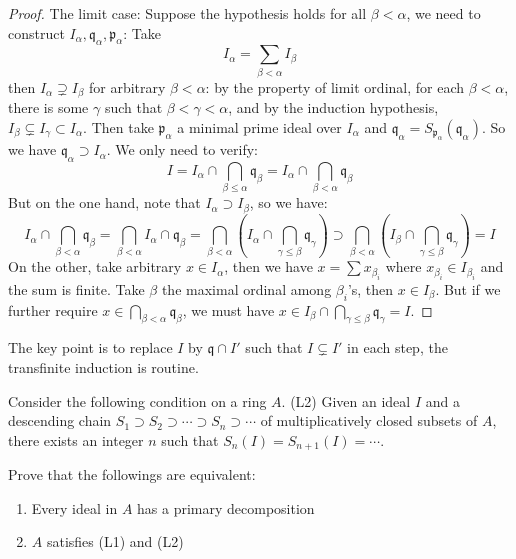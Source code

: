\documentclass{solution}
\begin{document}
\begin{proof}
    The limit case: Suppose the hypothesis holds for all $\beta \lt \alpha$, we need to construct $I_{\alpha}, \mathfrak{q}_{\alpha}, \mathfrak{p}_{\alpha}$: Take
    $$I_{\alpha} = \sum\limits_{\beta \lt \alpha} I_{\beta}$$
    then $I_{\alpha} \supsetneq I_{\beta}$ for arbitrary $\beta \lt \alpha$: by the property of limit ordinal, for each $\beta \lt \alpha$, there is some $\gamma$ such that $\beta \lt \gamma \lt \alpha$, and by the induction hypothesis, $I_{\beta} \subsetneq I_{\gamma} \subset I_{\alpha}$. Then take $\mathfrak{p}_{\alpha}$ a minimal prime ideal over $I_{\alpha}$ and $\mathfrak{q}_{\alpha} = S_{\mathfrak{p}_{\alpha}}(\mathfrak{q}_\alpha)$. So we have $\mathfrak{q}_{\alpha} \supset I_{\alpha}$. We only need to verify:
    $$I = I_{\alpha} \cap \bigcap\limits_{\beta \le \alpha} \mathfrak{q}_{\beta} = I_{\alpha} \cap \bigcap\limits_{\beta \lt \alpha} \mathfrak{q}_{\beta}$$
    But on the one hand, note that $I_{\alpha} \supset I_\beta$, so we have:
    $$I_{\alpha} \cap \bigcap\limits_{ \beta \lt \alpha} \mathfrak{q}_\beta = \bigcap\limits_{ \beta \lt \alpha} I_{\alpha} \cap \mathfrak{q}_\beta = \bigcap\limits_{\beta \lt \alpha} \left(I_{\alpha} \cap \bigcap\limits_{\gamma \le \beta} \mathfrak{q}_{\gamma}\right) \supset \bigcap\limits_{\beta \lt \alpha} \left(I_{\beta} \cap \bigcap\limits_{\gamma \le \beta} \mathfrak{q}_{\gamma}\right) = I$$
    On the other, take arbitrary $x \in I_{\alpha}$, then we have $x = \sum x_{\beta_i}$ where $x_{\beta_i} \in I_{\beta_i}$ and the sum is finite. Take $\beta$ the maximal ordinal among $\beta_i$'s, then $x \in I_{\beta}$. But if we further require $x \in \bigcap\limits_{\beta \lt \alpha} \mathfrak{q}_{\beta}$, we must have $x \in I_\beta \cap \bigcap\limits_{\gamma \le \beta} \mathfrak{q}_{\gamma} = I$.
\end{proof}

{\color{red} The key point is to replace $I$ by $\mathfrak{q} \cap I'$ such that $I \subsetneq I'$ in each step, the transfinite induction is routine.}

\begin{problem}
    Consider the following condition on a ring $A$. (L2) Given an ideal $I$ and a descending chain $S_1 \supset S_2 \supset \cdots \supset S_n \supset \cdots$ of multiplicatively closed subsets of $A$, there exists an integer $n$ such that $S_n(I) = S_{n + 1}(I) = \cdots$.

    Prove that the followings are equivalent:
    \begin{enumerate}
        \item Every ideal in $A$ has a primary decomposition
        \item $A$ satisfies (L1) and (L2)
    \end{enumerate}
\end{problem}
\end{document}
